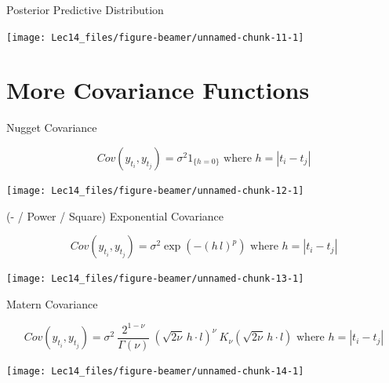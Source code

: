 \documentclass[11pt,ignorenonframetext,]{beamer}
\begin{document}
\begin{frame}[t]{Posterior Predictive Distribution}
\protect\hypertarget{posterior-predictive-distribution-1}{}

\begin{center}\texttt{[image: Lec14\_files/figure-beamer/unnamed-chunk-11-1]} \end{center}

\end{frame}

\hypertarget{more-covariance-functions}{%
\section{More Covariance Functions}\label{more-covariance-functions}}

\begin{frame}[t]{Nugget Covariance}
\protect\hypertarget{nugget-covariance}{}

\vspace{-5mm}

\[ Cov(y_{t_i}, y_{t_j}) = \sigma^2 {1}_{\{h=0\}} \text{   where } h = |t_i - t_j|\]

\vspace{5mm}

\begin{center}\texttt{[image: Lec14\_files/figure-beamer/unnamed-chunk-12-1]} \end{center}

\end{frame}

\begin{frame}[t]{(- / Power / Square) Exponential Covariance}
\protect\hypertarget{power-square-exponential-covariance}{}

\vspace{-5mm}

\[ Cov(y_{t_i}, y_{t_j}) = \sigma^2\exp\left(-(h\,l)^p\right) \text{   where } h = |t_i - t_j|\]

\begin{center}\texttt{[image: Lec14\_files/figure-beamer/unnamed-chunk-13-1]} \end{center}

\end{frame}

\begin{frame}[t]{Matern Covariance}
\protect\hypertarget{matern-covariance}{}

\vspace{-10mm}

\[ Cov(y_{t_i}, y_{t_j}) = \sigma^2 ~ \frac{2^{1-\nu}}{\Gamma(\nu)} ~ \left(\sqrt{2\nu}\, h \cdot l\right)^\nu ~ K_\nu\left(\sqrt{2\nu} \, h \cdot l\right) \text{   where } h = |t_i - t_j|\]

\begin{center}\texttt{[image: Lec14\_files/figure-beamer/unnamed-chunk-14-1]} \end{center}

\end{frame}
\end{document}
